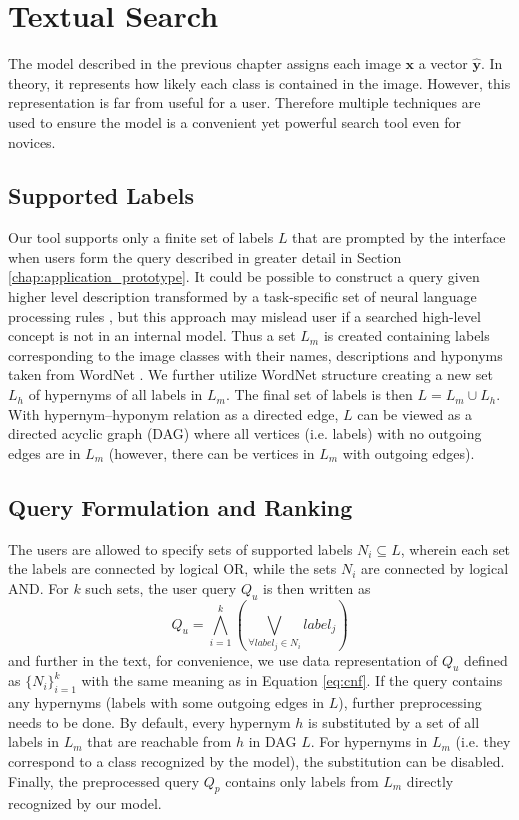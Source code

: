\chapter{Textual Search}\label{chap:text_search}

The model described in the previous chapter assigns each image $\bm{x}$ a vector $\bm{\hat{y}}$. In theory, it represents how likely each class is contained in the image. However, this representation is far from useful for a user. Therefore multiple techniques are used to ensure the model is a convenient yet powerful search tool even for novices.

\section{Supported Labels}
Our tool supports only a finite set of labels $L$ that are prompted by the interface when users form the query described in greater detail in Section \ref{chap:application_prototype}. It could be possible to construct a query given higher level description transformed by a task-specific set of neural language processing rules \cite{moumtzidou2017verge}, but this approach may mislead user if a searched high-level concept is not in an internal model. Thus a set $L_m$ is created containing labels corresponding to the image classes with their \textsf{names}, \textsf{descriptions} and \textsf{hyponyms} taken from WordNet \cite{WordNet}. We further utilize WordNet structure creating a new set $L_h$ of hypernyms of all labels in $L_m$. The final set of labels is then $L=L_m\cup L_h$. With hypernym--hyponym relation as a directed edge, $L$ can be viewed as a directed acyclic graph (DAG) where all vertices (i.e. labels) with no outgoing edges are in $L_m$ (however, there can be vertices in $L_m$ with outgoing edges).

\section{Query Formulation and Ranking}\label{sec:query_formulation_and_ranking}
The users are allowed to specify sets of supported labels $N_i \subseteq L$, wherein each set the labels are connected by logical \textsf{OR}, while the sets $N_i$ are connected by logical \textsf{AND}. For $k$ such sets, the user query $Q_u$ is then written as
\begin{equation}
	Q_u=\bigwedge\limits_{i=1}^k\left(\bigvee\limits_{\forall label_j\in N_i} label_j \right)\label{eq:cnf}
\end{equation}
and further in the text, for convenience, we use data representation of $Q_u$ defined as $\{N_i\}_{i=1}^k$ with the same meaning as in Equation \ref{eq:cnf}. If the query contains any hypernyms (labels with some outgoing edges in $L$), further preprocessing needs to be done. By default, every hypernym $h$ is substituted by a set of all labels in $L_m$ that are reachable from $h$ in DAG $L$. For hypernyms in $L_m$ (i.e. they correspond to a class recognized by the model), the substitution can be disabled. Finally, the preprocessed query $Q_p$ contains only labels from $L_m$ directly recognized by our model.

